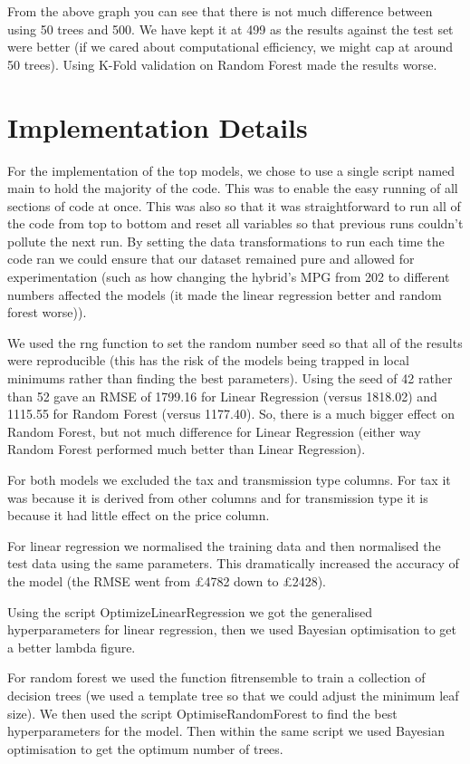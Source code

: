 \documentclass[a4pape, 11pt, english]{article}
\begin{document}
From the above graph you can see that there is not much difference between using 50 trees and 500. We have kept it at 499 as the results against the test set were better (if we cared about computational efficiency, we might cap at around 50 trees).
Using K-Fold validation on Random Forest made the results worse.

\section{Implementation Details}
For the implementation of the top models, we chose to use a single script named main to hold the majority of the code. This was to enable the easy running of all sections of code at once. This was also so that it was straightforward to run all of the code from top to bottom and reset all variables so that previous runs couldn't pollute the next run. By setting the data transformations to run each time the code ran we could ensure that our dataset remained pure and allowed for experimentation (such as how changing the hybrid's MPG from 202 to different numbers affected the models (it made the linear regression better and random forest worse)).

We used the rng function to set the random number seed so that all of the results were reproducible (this has the risk of the models being trapped in local minimums rather than finding the best parameters). Using the seed of 42 rather than 52 gave an RMSE of 1799.16 for Linear Regression (versus 1818.02) and 1115.55 for Random Forest (versus 1177.40). So, there is a much bigger effect on Random Forest, but not much difference for Linear Regression (either way Random Forest performed much better than Linear Regression).

For both models we excluded the tax and transmission type columns. For tax it was because it is derived from other columns and for transmission type it is because it had little effect on the price column.

For linear regression we normalised the training data and then normalised the test data using the same parameters. This dramatically increased the accuracy of the model (the RMSE went from £4782 down to £2428).

Using the script OptimizeLinearRegression we got the generalised hyperparameters for linear regression, then we used Bayesian optimisation to get a better lambda figure.

For random forest we used the function fitrensemble to train a collection of decision trees (we used a template tree so that we could adjust the minimum leaf size). We then used the script OptimiseRandomForest to find the best hyperparameters for the model. Then within the same script we used Bayesian optimisation to get the optimum number of trees.
\end{document}
